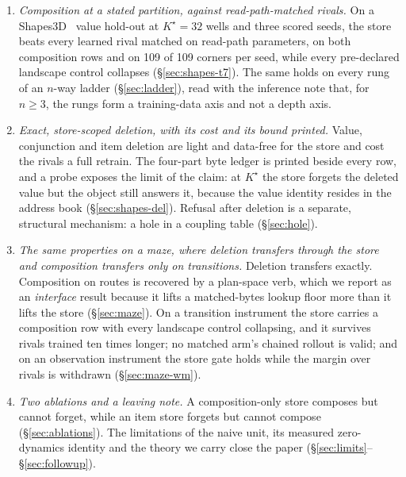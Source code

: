 \documentclass{article} %
\newcommand{\Kstar}{\ensuremath{K^{\star}}}
\begin{document}
\begin{enumerate}[leftmargin=*,itemsep=2pt]
\item \emph{Composition at a stated partition, against read-path-matched rivals.} On a
  Shapes3D~\citep{burgess2018shapes,kim2018disentangling} value hold-out at $\Kstar=32$ wells and three scored seeds, the store beats every %
  learned rival matched on read-path parameters, on both composition rows and on 109 of 109 %
  corners per seed, while every pre-declared landscape control collapses
  (\S\ref{sec:shapes-t7}). The same holds on every rung of an $n$-way ladder
  (\S\ref{sec:ladder}), read with the inference note that, for $n\ge3$, the rungs form a
  training-data axis and not a depth axis.
\item \emph{Exact, store-scoped deletion, with its cost and its bound printed.} Value, conjunction and item deletion are light and data-free for the store and cost the rivals a full retrain. The four-part byte ledger is printed beside every row, and a probe exposes the
  limit of the claim: at $\Kstar$ the store forgets the deleted value but the object still
  answers it, because the value identity resides in the address book (\S\ref{sec:shapes-del}).
  Refusal after deletion is a separate, structural mechanism: a hole in a coupling table
  (\S\ref{sec:hole}).
\item \emph{The same properties on a maze, where deletion transfers through the
  store and composition transfers only on transitions.} Deletion transfers exactly. Composition on routes is recovered by a plan-space verb,
  which we report as an \emph{interface} result because it lifts a matched-bytes lookup
  floor more than it lifts the store (\S\ref{sec:maze}). On a transition instrument the store
  carries a composition row with every landscape control collapsing, and it survives rivals
  trained ten times longer; no matched arm's chained rollout is valid; and on an observation
  instrument the store gate holds while the margin over rivals is withdrawn (\S\ref{sec:maze-wm}).
\item \emph{Two ablations and a leaving note.} A composition-only store composes but cannot
  forget, while an item store forgets but cannot compose (\S\ref{sec:ablations}). The
  limitations of the naive unit, its measured zero-dynamics identity and the theory we carry
  close the paper (\S\ref{sec:limits}--\S\ref{sec:followup}).
\end{enumerate}
\end{document}
